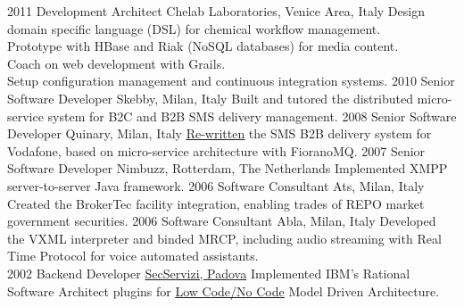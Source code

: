 \documentclass[letterpaper]{twentysecondcv} %
\begin{document}
\begin{twenty}
    	\twentyitem
    	{2011}
    	{}
    	{Development Architect}
    	{Chelab Laboratories, Venice Area, Italy}
    	{}
    	{
    	Design domain specific language (DSL) for chemical workflow management.\\
    	Prototype with HBase and Riak (NoSQL databases) for media content.\\
    	Coach on web development with Grails.\\
    	Setup configuration management and continuous integration systems.
    	}
    	\twentyitem
    	{2010}
    	{}
    	{Senior Software Developer}
    	{Skebby, Milan, Italy}
    	{}
    	{
    	Built and tutored the distributed micro-service system for B2C and B2B SMS delivery management.
    	}
    	\twentyitem
    	{2008}
    	{}
    	{Senior Software Developer}
    	{Quinary, Milan, Italy}
    	{}
    	{
    	\href{https://gfrison.com/2009/04/24/powered-by-apache-mina/}{\underline{Re-written}} the SMS B2B delivery system for Vodafone, based on micro-service architecture with FioranoMQ.
    	}
    	\twentyitem
    	{2007}
    	{}
    	{Senior Software Developer}
    	{Nimbuzz, Rotterdam, The Netherlands}
    	{}
    	{
    Implemented XMPP server-to-server Java framework.
    	}
    	\twentyitem
    	{2006}
    	{}
    	{Software Consultant}
    	{Ats, Milan, Italy}
    	{}
    	{
    Created the BrokerTec facility integration, enabling trades of REPO market government securities.
    	}
    	\twentyitem
    	{2006}
    	{}
    	{Software Consultant}
    	{Abla, Milan, Italy}
    	{}
    	{
    Developed the VXML interpreter and binded MRCP, including audio streaming with Real Time Protocol for voice automated assistants.
    	}
   	\\
     \twentyitem
   		{2002}
		{}
        {Backend Developer}
        {\href{}{SecServizi, Padova}}
        {}
        {
    Implemented IBM's Rational Software Architect plugins for \href{https://gfrison.com/tags/\#low-code-no-code}{\underline{Low Code/No Code}} Model Driven Architecture.
       	}

\end{twenty}
\end{document}
